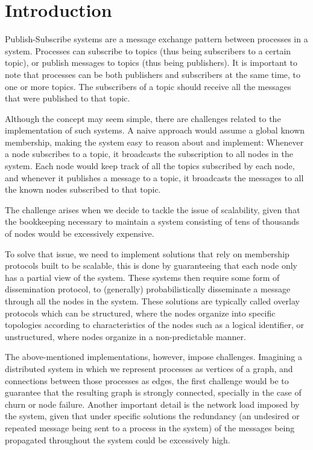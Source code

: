 \documentclass[sigconf]{acmart}
\begin{document}
\section{Introduction}

Publish-Subscribe systems are a message exchange pattern between processes in a system. Processes can subscribe to topics (thus being subscribers to a certain topic), or publish messages to topics (thus being publishers). It is important to note that processes can be both publishers and subscribers at the same time, to one or more topics. The subscribers of a topic should receive all the messages that were published to that topic.

Although the concept may seem simple, there are challenges related to the implementation of such systems. A naive approach would assume a global known membership, making the system easy to reason about and implement:
Whenever a node subscribes to a topic, it broadcasts the subscription to all nodes in the system. Each node would keep track of all the topics subscribed by each node, and whenever it publishes a message to a topic, it broadcasts the messages to all the known nodes subscribed to that topic.

The challenge arises when we decide to tackle the issue of scalability, given that the bookkeeping necessary to maintain a system consisting of tens of thousands of nodes would be excessively expensive.

To solve that issue, we need to implement solutions that rely on membership protocols built to be scalable, this is done by guaranteeing that each node only has a partial view of the system. These systems then require some form of dissemination protocol, to (generally) probabilistically disseminate a message through all the nodes in the system.
These solutions are typically called overlay protocols which can be structured, where the nodes organize into specific topologies according to characteristics of the nodes such as a logical identifier, or unstructured, where nodes organize in a non-predictable manner.

The above-mentioned implementations, however, impose challenges. Imagining a distributed system in which we represent processes as vertices of a graph, and connections between those processes as edges, the first challenge would be to guarantee that the resulting graph is strongly connected, specially in the case of churn or node failure. Another important detail is the network load imposed by the system, given that under specific solutions the redundancy (an undesired or repeated message being sent to a process in the system) of the messages being propagated throughout the system could be excessively high.
\end{document}
